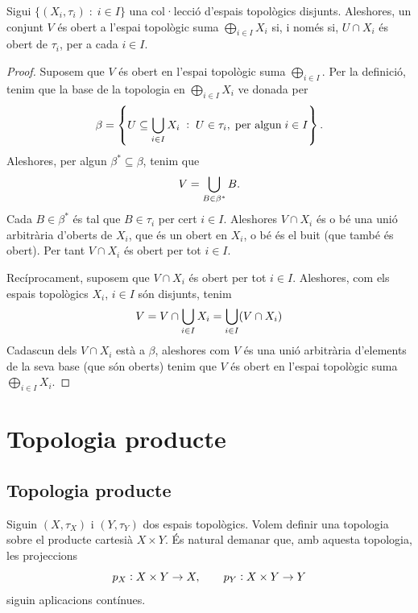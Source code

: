 \documentclass[../main.tex]{subfiles}
\begin{document}
\begin{ter}
\label{ter:topologiasuma} Sigui $\{(X_i,\tau_i)\;:\;i\in I\}$ una col·lecció d'espais topològics disjunts. Aleshores, un conjunt $V$ és obert a l'espai topològic suma $\bigoplus_{i\in I} X_i$ si, i només si, $U\cap X_i$ és obert de $\tau_i$, per a cada $i\in I$.
\end{ter}
\begin{proof}
Suposem que $V$ és obert en l'espai topològic suma $\bigoplus_{i\in I}$. Per la definició, tenim que la base de la topologia en $\bigoplus_{i\in I}X_i$ ve donada per 
\begin{equation}
    \notag
    \beta = \left\{U\subseteq\bigcup_{i\in I}X_i\;:\;U\in\tau_i,\;\text{per algun}\;i\in I\right\} .
\end{equation}
Aleshores, per algun $\beta^*\subseteq \beta$, tenim que
\begin{equation}
    \notag
    V = \bigcup_{B\in\beta^*}B.
\end{equation}
Cada $B\in\beta^*$ és tal que $B\in\tau_i$ per cert $i\in I$. Aleshores $V\cap X_i$ és o bé una unió arbitrària d'oberts de $X_i$, que és un obert en $X_i$, o bé és el buit (que també és obert). Per tant $V\cap X_i$ és obert per tot $i\in I$.

Recíprocament, suposem que $V\cap X_i$ és obert per tot $i\in I$. Aleshores, com els espais topològics $X_i$, $i\in I$ són disjunts, tenim
\begin{equation}
    \notag
    V = V\cap \bigcup_{i\in I}X_i = \bigcup_{i\in I}(V\cap X_i)
\end{equation}
Cadascun dels $V\cap X_i$ està a $\beta$, aleshores com $V$ és una unió arbitrària d'elements de la seva base (que són oberts) tenim que $V$ és obert en l'espai topològic suma $\bigoplus_{i\in I}X_i$.
\end{proof}



\section{Topologia producte}
\subsection{Topologia producte}
Siguin $(X,\tau_X)$ i $(Y,\tau_Y)$ dos espais topològics. Volem definir una topologia sobre el producte cartesià $X\times Y$. És natural demanar que, amb aquesta topologia, les projeccions
\begin{equation}
    \notag
    p_X:X\times Y\rightarrow X,\qquad p_Y:X\times Y\rightarrow Y
\end{equation}
siguin aplicacions contínues.
\end{document}
